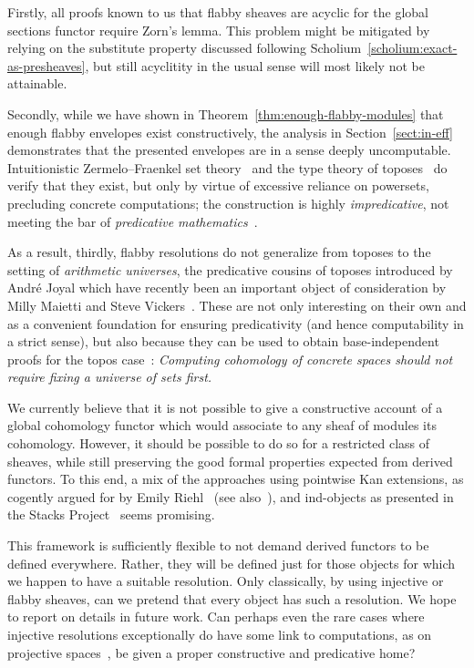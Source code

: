 \documentclass[oneside]{amsart}
\theoremstyle{definition}
\theoremstyle{plain}
\theoremstyle{remark}
\renewcommand{\_}{\mathpunct{.}\,}
\begin{document}
Firstly, all proofs known to us that flabby sheaves are
acyclic for the global sections functor require Zorn's lemma. This problem might
be mitigated by relying on the substitute property discussed
following Scholium~\ref{scholium:exact-as-presheaves}, but still acyclitity in
the usual sense will most likely not be attainable.

Secondly, while we have shown in Theorem~\ref{thm:enough-flabby-modules} that
enough flabby envelopes exist constructively, the analysis in Section~\ref{sect:in-eff}
demonstrates that the presented envelopes are in a sense deeply uncomputable.
Intuitionistic Zermelo--Fraenkel set theory~\cite{crosilla:cst-izf} and the
type theory of toposes~\cite{maietti:modular} do verify that they exist, but
only by virtue of excessive reliance on powersets, precluding concrete
computations; the construction is highly \emph{impredicative}, not meeting the
bar of \emph{predicative mathematics}~\cite{crosilla:predicativity}.

As a result, thirdly, flabby resolutions do not generalize from toposes to the
setting of \emph{arithmetic universes}, the predicative cousins of toposes
introduced by André Joyal which have recently been an important object of
consideration by Milly Maietti and
Steve Vickers~\cite{maietti:au,maietti-vickers:induction,vickers:sketches}.
These are not only interesting on their own and as a convenient foundation
for ensuring predicativity (and hence computability in a strict sense), but also
because they can be used to obtain base-independent proofs for the topos
case~\cite{vickers:classifying,hazratpour:phd}: \emph{Computing cohomology of
concrete spaces should not require fixing a universe of sets first.}

We currently believe that it is not possible to give a constructive account of
a global cohomology functor which would associate to any sheaf of modules its
cohomology. However, it should be possible to do so for a restricted class of
sheaves, while still preserving the good formal properties expected from
derived functors. To this end, a mix of the approaches using
pointwise Kan extensions, as cogently argued for by Emily
Riehl~\cite[Chapter~2]{riehl:cathtpy} (see also~\cite{hinich:what-is,maltsiniotis:adjunction}), and ind-objects as presented in the Stacks
Project~\cite[Tag~05S7]{stacks-project} seems promising.

This framework is sufficiently flexible to not demand derived functors to be
defined everywhere. Rather, they will be defined just for those objects for
which we happen to have a suitable resolution. Only classically, by using
injective or flabby sheaves, can we pretend that every object has such a
resolution. We hope to report on details in future work. Can perhaps even the
rare cases where injective resolutions exceptionally do have some link to
computations, as on projective spaces~\cite{huang:cohomology}, be given a
proper constructive and predicative home?
\end{document}
